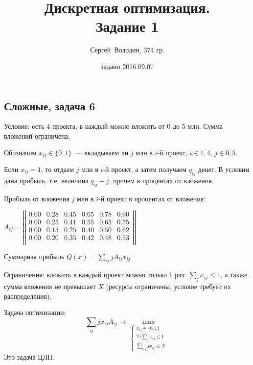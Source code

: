 \documentclass[a4paper]{article}
\title{Дискретная оптимизация.\\Задание 1}
\date{задано 2016.09.07}
\author{Сергей~Володин, 374 гр.}
\newcommand{\matrixl}{\left|\left|}
\newcommand{\matrixr}{\right|\right|}
\begin{document}
\maketitle

\subsection*{Сложные, задача 6}
Условие: есть 4 проекта, в каждый можно вложить от 0 до 5 млн. Сумма вложений ограничена.

Обозначим $x_{ij}\in\{0,1\}$~--- вкладываем ли $j$ млн в $i$-й проект, $i\in\overline{1,4}$, $j\in\overline{0,5}$.

Если $x_{ij}=1$, то отдаем $j$ млн в $i$-й проект, а затем получаем $q_{ij}$ денег. В условии дана прибыль, т.е. величина $q_{ij}-j$, причем в процентах от вложения.

Прибыль от вложения $j$ млн в $i$-й проект в процентах от вложения:

$A_{ij}=\matrixl\begin{array}{ccccccc}
0.00 & 0.28 & 0.45 & 0.65 & 0.78 & 0.90\\
0.00 & 0.25 & 0.41 & 0.55 & 0.65 & 0.75\\
0.00 & 0.15 & 0.25 & 0.40 & 0.50 & 0.62\\
0.00 & 0.20 & 0.35 & 0.42 & 0.48 & 0.53\\
\end{array}
\matrixr$

Суммарная прибыль $Q(x)=\sum\limits_{ij}jA_{ij}x_{ij}$

Ограничения: вложить в каждый проект можно только 1 раз: $\sum\limits_{j} x_{ij}\leqslant 1$, а также сумма вложения не превышает $X$ (ресурсы ограничены, условие требует их распределения).

Задача оптимизации:
$$\sum\limits_{ij}jx_{ij}A_{ij}\to\max_{\begin{cases}
	x_{ij}\in\{0,1\}\\
	\forall i \sum\limits_{j} x_{ij}\leqslant 1\\
	\sum\limits_{i,j}jx_{ij}\leqslant X
	\end{cases}}$$
Это задача ЦЛП.
\end{document}
